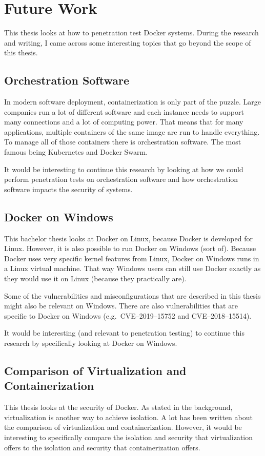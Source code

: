 \chapter{Future Work}
This thesis looks at how to penetration test Docker systems. During the research and writing, I came across some interesting topics that go beyond the scope of this thesis.

\section{Orchestration Software}
In modern software deployment, containerization is only part of the puzzle. Large companies run a lot of different software and each instance needs to support many connections and a lot of computing power. That means that for many applications, multiple containers of the same image are run to handle everything. To manage all of those containers there is orchestration software. The most famous being Kubernetes and Docker Swarm.

It would be interesting to continue this research by looking at how we could perform penetration tests on orchestration software and how orchestration software impacts the security of systems.

\section{Docker on Windows}
This bachelor thesis looks at Docker on Linux, because Docker is developed for Linux. However, it is also possible to run Docker on Windows (sort of). Because Docker uses very specific kernel features from Linux, Docker on Windows runs in a Linux virtual machine. That way Windows users can still use Docker exactly as they would use it on Linux (because they practically are).

\medskip

Some of the vulnerabilities and misconfigurations that are described in this thesis might also be relevant on Windows. There are also vulnerabilities that are specific to Docker on Windows (e.g.\ CVE--2019--15752 and CVE--2018--15514).

\medskip

It would be interesting (and relevant to penetration testing) to continue this research by specifically looking at Docker on Windows.

\section{Comparison of Virtualization and Containerization}
This thesis looks at the security of Docker. As stated in the background, virtualization is another way to achieve isolation. A lot has been written about the comparison of virtualization and containerization\cite{Virtualization-vs-Containerization-to-Support-PaaS}\cite{Hypervisor-vs-Lightweight-Virtualization}\cite{Updated-Performance-Comparison-Virtual-Machines-Containers}.
However, it would be interesting to specifically compare the isolation and security that virtualization offers to the isolation and security that containerization offers.


